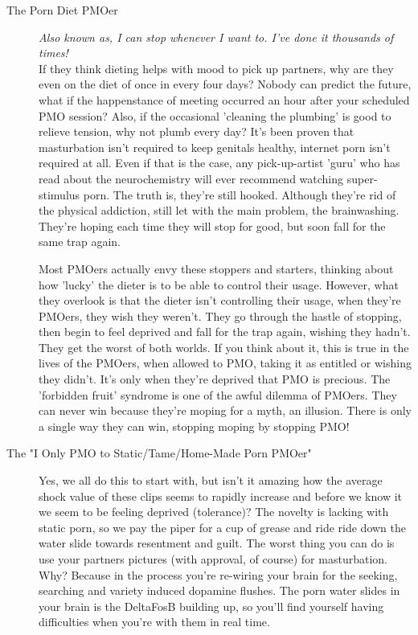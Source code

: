 \documentclass[easypeasy]{subfiles}
\begin{document}
\begin{description}
    \item [The Porn Diet PMOer] \textit{Also known as, I can stop whenever I want to. I've done it thousands of times!}\\ If they think dieting helps with mood to pick up partners, why are they even on the diet of once in every four days? Nobody can predict the future, what if the happenstance of meeting occurred an hour after your scheduled PMO session? Also, if the occasional 'cleaning the plumbing' is good to relieve tension, why not plumb every day? It's been proven that masturbation isn't required to keep genitals healthy, internet porn isn't required at all. Even if that is the case, any pick-up-artist 'guru' who has read about the neurochemistry will ever recommend watching super-stimulus porn. The truth is, they're still hooked. Although they're rid of the physical addiction, still let with the main problem, the brainwashing. They're hoping each time they will stop for good, but soon fall for the same trap again.

  Most PMOers actually envy these stoppers and starters, thinking about how 'lucky' the dieter is to be able to control their usage. However, what they overlook is that the dieter isn't controlling their usage, when they're PMOers, they wish they weren't. They go through the hastle of stopping, then begin to feel deprived and fall for the trap again, wishing they hadn't. They get the worst of both worlds. If you think about it, this is true in the lives of the PMOers, when allowed to PMO, taking it as entitled or wishing they didn't. It's only when they're deprived that PMO is precious. The 'forbidden fruit' syndrome is one of the awful dilemma of PMOers. They can never win because they're moping for a myth, an illusion. There is only a single way they can win, stopping moping by stopping PMO!

\item [The "I Only PMO to Static/Tame/Home-Made Porn PMOer"] Yes, we all do this to start with, but isn't it amazing how the average shock value of these clips seems to rapidly increase and before we know it we seem to be feeling deprived (tolerance)? The novelty is lacking with static porn, so we pay the piper for a cup of grease and ride ride down the water slide towards resentment and guilt. The worst thing you can do is use your partners pictures (with approval, of course) for masturbation. Why? Because in the process you're re-wiring your brain for the seeking, searching and variety induced dopamine flushes. The porn water slides in your brain is the DeltaFosB building up, so you'll find yourself having difficulties when you're with them in real time.


\end{description}
\end{document}
